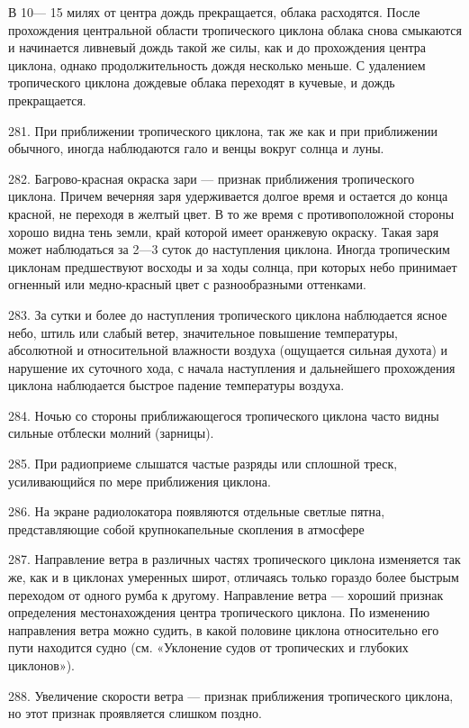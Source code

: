 В 10— 15 милях от центра дождь прекращается, облака расходятся. После прохождения центральной области тропического циклона облака снова смыкаются и начинается ливневый дождь такой же силы, как и до прохождения центра циклона, однако продолжительность дождя несколько меньше. С удалением тропического циклона дождевые облака переходят в кучевые, и дождь прекращается.

281. При приближении тропического циклона, так же как и при приближении обычного, иногда наблюдаются гало и венцы вокруг солнца и луны.

282. Багрово-красная окраска зари — признак приближения тропического циклона. Причем вечерняя заря удерживается долгое время и остается до конца красной, не переходя в желтый цвет. В то же время с противоположной стороны хорошо видна тень земли, край которой имеет оранжевую окраску. Такая заря может наблюдаться за 2—3 суток до наступления циклона. Иногда тропическим циклонам предшествуют восходы и за ходы солнца, при которых небо принимает огненный или медно-красный цвет с разнообразными оттенками.

283. За сутки и более до наступления тропического циклона наблюдается ясное небо, штиль или слабый ветер, значительное повышение температуры, абсолютной и относительной влажности воздуха (ощущается сильная духота) и нарушение их суточного хода, с начала наступления и дальнейшего прохождения циклона наблюдается быстрое падение температуры воздуха.

284. Ночью со стороны приближающегося тропического циклона часто видны сильные отблески молний (зарницы).

285. При радиоприеме слышатся частые разряды или сплошной треск, усиливающийся по мере приближения циклона.

286. На экране радиолокатора появляются отдельные светлые пятна, представляющие собой крупнокапельные скопления в атмосфере

287. Направление ветра в различных частях тропического циклона изменяется так же, как и в циклонах умеренных широт, отличаясь только гораздо более быстрым переходом от одного румба к другому. Направление ветра — хороший признак определения местонахождения центра тропического циклона. По изменению направления ветра можно судить, в какой половине циклона относительно его пути находится судно (см. «Уклонение судов от тропических и глубоких циклонов»).

288. Увеличение скорости ветра — признак приближения тропического циклона, но этот признак проявляется слишком поздно.

